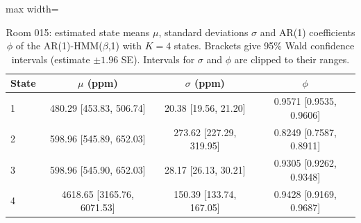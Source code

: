\begin{table}[ht]
\centering
\begin{adjustbox}{max width=\textwidth}
\begin{tabular}{lccc}
\hline
State & $\mu$ (ppm) & $\sigma$ (ppm) & $\phi$ \\
\hline
1 & 480.29 [453.83, 506.74] & 20.38 [19.56, 21.20] & 0.9571 [0.9535, 0.9606] \\
2 & 598.96 [545.89, 652.03] & 273.62 [227.29, 319.95] & 0.8249 [0.7587, 0.8911] \\
3 & 598.96 [545.90, 652.03] & 28.17 [26.13, 30.21] & 0.9305 [0.9262, 0.9348] \\
4 & 4618.65 [3165.76, 6071.53] & 150.39 [133.74, 167.05] & 0.9428 [0.9169, 0.9687] \\
\hline
\end{tabular}
\end{adjustbox}
\caption{Room 015: estimated state means $\mu$, standard deviations $\sigma$ and AR(1) coefficients $\phi$ of the AR(1)-HMM($\beta$,1) with $K=4$ states. Brackets give 95\% Wald confidence intervals (estimate $\pm 1.96$ SE). Intervals for $\sigma$ and $\phi$ are clipped to their ranges.}
\label{tab:params_emission_room_015_calibrated_anchor_random_search_ar1_hmm_beta_1_K4}
\end{table}
